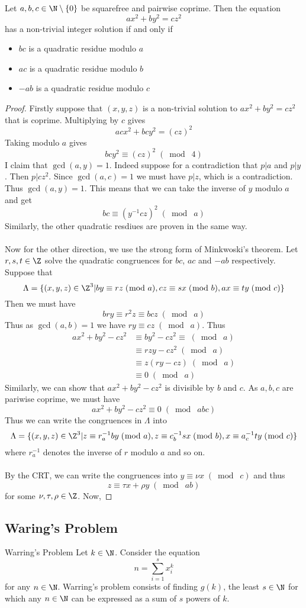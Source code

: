 \begin{thm}{}{} Let $a,b,c\in\N\setminus\{0\}$ be squarefree and pairwise coprime. Then the equation $$ax^2+by^2=cz^2$$ has a non-trivial integer solution if and only if 
\begin{itemize}
\item $bc$ is a quadratic residue modulo $a$
\item $ac$ is a quadratic residue modulo $b$
\item $-ab$ is a quadratic residue modulo $c$
\end{itemize} \tcbline
\begin{proof}
Firstly suppose that $(x,y,z)$ is a non-trivial solution to $ax^2+by^2=cz^2$ that is coprime. Multiplying by $c$ gives $$acx^2+bcy^2=(cz)^2$$ Taking modulo $a$ gives $$bcy^2\equiv(cz)^2\;(\bmod\;4)$$
I claim that $\gcd(a,y)=1$. Indeed suppose for a contradiction that $p|a$ and $p|y$. Then $p|cz^2$. Since $\gcd(a,c)=1$ we must have $p|z$, which is a contradiction. Thus $\gcd(a,y)=1$. This means that we can take the inverse of $y$ modulo $a$ and get $$bc\equiv(y^{-1}cz)^2\;(\bmod\;a)$$ Similarly, the other quadratic resdiues are proven in the same way. \\~\\
Now for the other direction, we use the strong form of Minkwoski's theorem. Let $r,s,t\in\Z$ solve the quadratic congruences for $bc$, $ac$ and $-ab$ respectively. Suppose that $$\Lambda=\{(x,y,z)\in\Z^3|by\equiv rz\;(\bmod\;a), cz\equiv sx\;(\bmod\;b), ax\equiv ty\;(\bmod\;c)\}$$ Then we must have $$bry\equiv r^2z\equiv bcz\;(\bmod\;a)$$ Thus as $\gcd(a,b)=1$ we have $ry\equiv cz\;(\bmod\;a)$. Thus 
\begin{align*}
ax^2+by^2-cz^2&\equiv by^2-cz^2\equiv\;(\bmod\;a)\\
&\equiv rzy-cz^2\;(\bmod\;a)\\
&\equiv z(ry-cz)\;(\bmod\;a)\\
&\equiv 0\;(\bmod\;a)
\end{align*}
Similarly, we can show that $ax^2+by^2-cz^2$ is divisible by $b$ and $c$. As $a,b,c$ are pariwise coprime, we must have $$ax^2+by^2-cz^2\equiv 0\;(\bmod\;abc)$$
Thus we can write the congruences in $\Lambda$ into $$\Lambda=\{(x,y,z)\in\Z^3|z\equiv r_a^{-1}by\;(\bmod\;a), z\equiv c_b^{-1}sx\;(\bmod\;b), x\equiv a_c^{-1}ty\;(\bmod\;c)\}$$ where $r_a^{-1}$ denotes the inverse of $r$ modulo $a$ and so on. \\~\\
By the CRT, we can write the congruences into $y\equiv\nu x\;(\bmod\;c)$ and thus $$z\equiv\tau x+\rho y\;(\bmod\;ab)$$ for some $\nu, \tau, \rho\in\Z$. Now, 
\end{proof}
\end{thm}

\subsection{Waring's Problem}
\begin{defn}{Warring's Problem}{} Let $k\in\N$. Consider the equation $$n=\sum_{i=1}^sx_i^k$$ for any $n\in\N$. Warring's problem consists of finding $g(k)$, the least $s\in\N$ for which any $n\in\N$ can be expressed as a sum of $s$ powers of $k$. 
\end{defn}